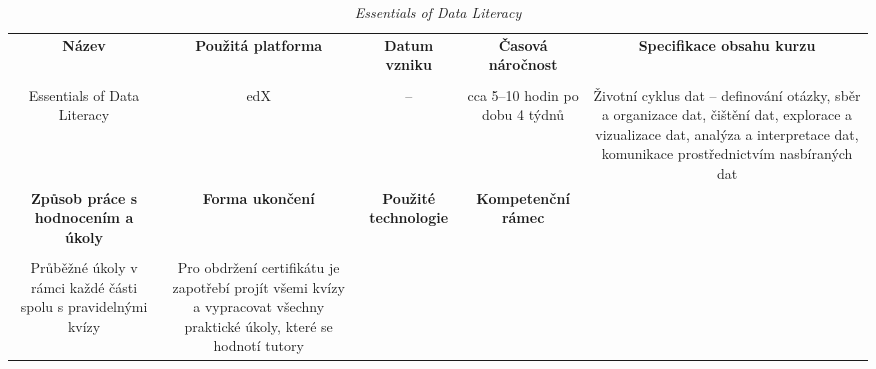 \begin{landscape}

\begin{table}[htbp]

\renewcommand\thetable{4}

\caption{\textit{Essentials of Data Literacy}}\label{tab4}

\footnotesize

{

\justifying

\begin{tabularx}{\linewidth}{CCCCC}

\toprule

\textbf{Název} &

\textbf{Použitá platforma} &

\textbf{Datum vzniku} &

\textbf{Časová náročnost} &
 
\textbf{Specifikace obsahu kurzu}

\\

\tabularnewline
\midrule

Essentials of Data Literacy

&

edX

&

–

&

cca 5–10 hodin po dobu 4 týdnů

&

Životní cyklus dat – definování otázky, sběr a organizace dat, čištění dat, explorace a vizualizace dat, analýza a interpretace dat, komunikace prostřednictvím nasbíraných dat

\\
\toprule

\textbf{Způsob práce s hodnocením a úkoly} &

\textbf{Forma ukončení} &

\textbf{Použité technologie} &

\textbf{Kompetenční rámec} 

\\

\tabularnewline
\midrule

Průběžné úkoly v rámci každé části spolu s pravidelnými kvízy

&

Pro obdržení certifikátu je zapotřebí projít všemi kvízy a vypracovat všechny praktické úkoly, které se hodnotí tutory


\end{tabularx}}
\end{table}
\end{landscape}
